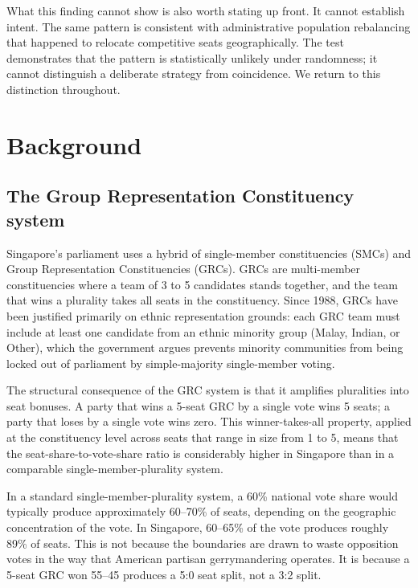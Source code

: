 \documentclass[12pt]{article}
\begin{document}
What this finding cannot show is also worth stating up front. It cannot establish intent. The same
pattern is consistent with administrative population rebalancing that happened to relocate
competitive seats geographically. The test demonstrates that the pattern is statistically unlikely
under randomness; it cannot distinguish a deliberate strategy from coincidence. We return to this
distinction throughout.

\section{Background}

\subsection{The Group Representation Constituency system}

Singapore's parliament uses a hybrid of single-member constituencies (SMCs) and Group
Representation Constituencies (GRCs). GRCs are multi-member constituencies where a team of 3 to
5 candidates stands together, and the team that wins a plurality takes all seats in the
constituency. Since 1988, GRCs have been justified primarily on ethnic representation grounds:
each GRC team must include at least one candidate from an ethnic minority group (Malay, Indian, or
Other), which the government argues prevents minority communities from being locked out of
parliament by simple-majority single-member voting.

The structural consequence of the GRC system is that it amplifies pluralities into seat bonuses.
A party that wins a 5-seat GRC by a single vote wins 5 seats; a party that loses by a single vote
wins zero. This winner-takes-all property, applied at the constituency level across seats that
range in size from 1 to 5, means that the seat-share-to-vote-share ratio is considerably higher
in Singapore than in a comparable single-member-plurality system.

In a standard single-member-plurality system, a 60\% national vote share would typically produce
approximately 60--70\% of seats, depending on the geographic concentration of the vote. In
Singapore, 60--65\% of the vote produces roughly 89\% of seats. This is not because the
boundaries are drawn to waste opposition votes in the way that American partisan gerrymandering
operates. It is because a 5-seat GRC won 55--45 produces a 5:0 seat split, not a 3:2 split.
\end{document}
